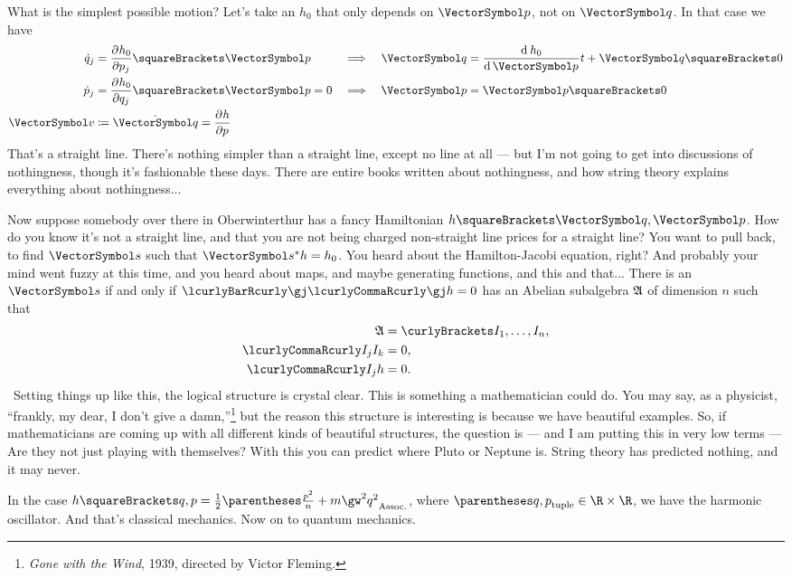\documentclass[10pt, a4paper, twoside]{lecturenotes}
\begin{document}
\begin{lecture}[date=2013-04-11]
What is the simplest possible motion? Let's take an $h_0$ that only depends on $\vp$, not on $\vq$. In that case we have
\begin{alignat*}{3}
\TimeDerivative q_j &= \pderiv{p_j}{h_0}\of\vp &\Implies&& \vq &= \deriv{\vp}{h_0}t + \vq\of{0} \\
\TimeDerivative p_j &= \pderiv{q_j}{h_0}\of\vp = 0 &\Implies && \vp &= \vp\of{0} \\
\vv &\DefineAs \TimeDerivative \vq = \pderiv p h
\end{alignat*}
That's a straight line. There's nothing simpler than a straight line, except no line at all --- but I'm not going to get into discussions of nothingness, though it's fashionable these days. There are entire books written about nothingness, and how string theory explains everything about nothingness...

Now suppose somebody over there in Oberwinterthur has a fancy Hamiltonian $h\of{\vq,\vp}$. How do you know it's not a straight line, and that you are not being charged non-straight line prices for a straight line? You want to pull back, to find $\vs$ such that $\Pullback \vs h = h_0$. You heard about the Hamilton-Jacobi equation, right? And probably your mind went fuzzy at this time, and you heard about maps, and maybe generating functions, and this and that... 
There is an $\vs$ if and only if $\setst{\gj}{\Poisson\gj h = 0}$ has an Abelian subalgebra $\mathfrak{A}$ of dimension $n$ such that
\begin{align*}
\LieAlgebraSymbol A &= \set{I_1,\dotsc,I_n}\text, \\
\Poisson{I_j}{I_k}&= 0\text,\\
\Poisson{I_j}{h}&=0\text.
\end{align*}
\
Setting things up like this, the logical structure is crystal clear. This is something a mathematician could do. You may say, as a physicist, ``frankly, my dear, I don't give a damn,''\footnote{\emph{Gone with the Wind}, 1939, directed by Victor Fleming.} but the reason this structure is interesting is because we have beautiful examples. So, if mathematicians are coming up with all different kinds of beautiful structures, the question is --- and I am putting this in very low terms --- Are they not just playing with themselves? With this you can predict where Pluto or Neptune is. String theory has predicted nothing, and it may never.

In the case $h\of{q,p}=\frac{1}{2}\pa{\frac{p^2}{n} + m\gw^2 q^2}$, where $\tuple{q,p}\in\R\Cartesian\R$, we have the harmonic oscillator.
And that's classical mechanics. Now on to quantum mechanics.


\end{lecture}
\end{document}
